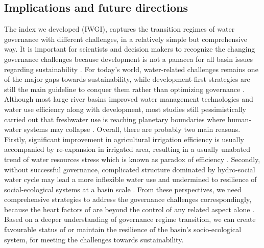 \documentclass[9pt, twocolumn, twoside, lineno]{pnas-new}
\begin{document}
\subsection*{Implications and future directions}
\label{Outlook}

The index we developed (IWGI), captures the transition regimes of water governance with different challenges, in a relatively simple but comprehensive way.
It is important for scientists and decision makers to recognize the changing governance challenges because development is not a panacea for all basin issues regarding sustainability 
\cite{cummingLinkingEconomicGrowth2018,reyers2018}.
For today's world, water-related challenges remains one of the major gaps towards sustainability, while development-first strategies are still the main guideline to conquer them rather than optimizing governance 
\cite{xu2020,liu2017,greveGlobalAssessmentWater2018}. 
Although most large river basins improved water management technologies and water use efficiency along with development, most studies still pessimistically carried out that freshwater use is reaching planetary boundaries where human-water systems may collapse 
\cite{li2020a,degraaf2019,huggins2020}.
Overall, there are probably two main reasons.
Firstly, significant improvement in agricultural irrigation efficiency is usually accompanied by re-expansion in irrigated area, resulting in a usually unabated trend of water resources stress which is known as paradox of efficiency 
\cite{grafton2018}. 
Secondly, without successful governance, complicated structure dominated by hydro-social water cycle may lead a more inflexible water use and undermined to resilience of social-ecological systems at a basin scale
\cite{qin2019,levia2020,grill2019}.
From these perspectives, we need comprehensive strategies to address the governance challenges correspondingly, because the heart factors of are beyond the control of any related aspect alone
\cite{steffen2020,muneepeerakul2020,bodinCollaborativeEnvironmentalGovernance2017,biermann2012}. 
Based on a deeper understanding of governance regime transition, we can create favourable status of or maintain the resilience of the basin's socio-ecological system, for meeting the challenges towards sustainability.
\end{document}
